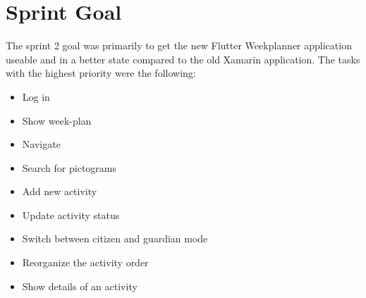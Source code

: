\section{Sprint Goal}

The sprint 2 goal was primarily to get the new Flutter Weekplanner application useable and in a better state compared to the old Xamarin application. The tasks with the highest priority were the following:

\begin{itemize}
    \item Log in
    \item Show week-plan
    \item Navigate
    \item Search for pictograms
    \item Add new activity
    \item Update activity status
    \item Switch between citizen and guardian mode
    \item Reorganize the activity order
    \item Show details of an activity
\end{itemize}
